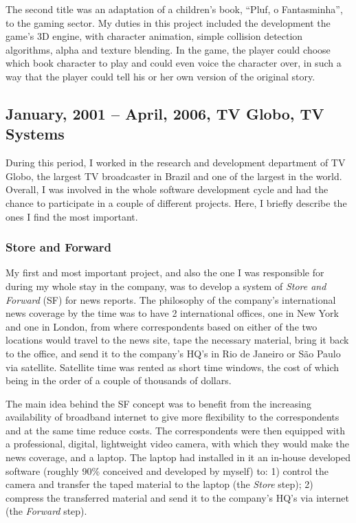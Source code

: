 \documentclass[a4paper]{article}
\begin{document}
The second title was an adaptation of a children's book, ``Pluf, o Fantasminha'', to the gaming sector. My duties in this project included the development the game's 3D engine, with character animation, simple collision detection algorithms, alpha and texture blending. In the game, the player could choose which book character to play and could even voice the character over, in such a way that the player could tell his or her own version of the original story. 

\subsection{January, 2001 -- April, 2006, TV Globo, TV Systems}

During this period, I worked in the research and development department of TV Globo, the largest TV broadcaster in Brazil and one of the largest in the world. Overall, I was involved in the whole software development cycle and had the chance to participate in a couple of different projects. Here, I briefly describe the ones I find the most important.

\subsubsection{Store and Forward}

My first and most important project, and also the one I was responsible for during my whole stay in the company, was to develop a system of {\em Store and Forward} (SF) for news reports. The philosophy of the company's international news coverage by the time was to have 2 international offices, one in New York and one in London, from where correspondents based on either of the two locations would travel to the news site, tape the necessary material, bring it back to the office, and send it to the company's HQ's in Rio de Janeiro or S\~ao Paulo via satellite. Satellite time was rented as short time windows, the cost of which being in the order of a couple of thousands of dollars. 

The main idea behind the SF concept was to benefit from the increasing availability of broadband internet to give more flexibility to the correspondents and at the same time reduce costs. The correspondents were then equipped with a professional, digital, lightweight video camera, with which they would make the news coverage, and a laptop. The laptop had installed in it an in-house developed software (roughly 90\% conceived and developed by myself) to: 1) control the camera and transfer the taped material to the laptop (the {\em Store} step); 2) compress the transferred material and send it to the company's HQ's via internet (the {\em Forward} step). 
\end{document}
